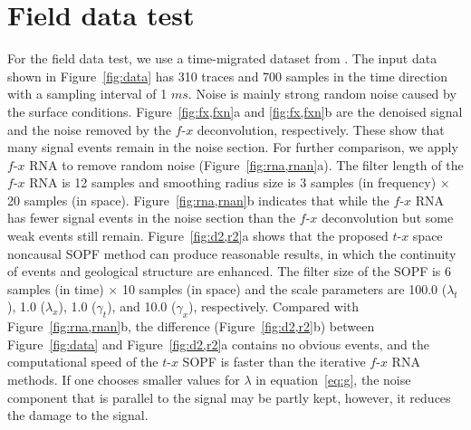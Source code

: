 
\section{Field data test}
For the field data test, we use a time-migrated dataset from
\cite{Liu13}. The input data shown in Figure~\ref{fig:data} has 310
traces and 700 samples in the time direction with a
sampling interval of 1 $ms$. Noise is mainly strong random noise
caused by the surface conditions. Figure~\ref{fig:fx,fxn}a and
\ref{fig:fx,fxn}b are the denoised signal and the noise removed by the
$f$-$x$ deconvolution, respectively. These show that many signal
events remain in the noise section. For further comparison, we apply
$f$-$x$ RNA to remove random noise (Figure~\ref{fig:rna,rnan}a). The
filter length of the $f$-$x$ RNA is 12 samples and smoothing radius
size is 3 samples (in frequency)
$\times$ 20 samples (in
space). Figure~\ref{fig:rna,rnan}b indicates that while the
$f$-$x$ RNA has fewer signal events in the noise section than the
$f$-$x$ deconvolution but some weak events still
remain. Figure~\ref{fig:d2,r2}a shows that the proposed $t$-$x$
space noncausal SOPF method can produce 
reasonable results, in which the continuity of events and geological
structure are enhanced. The filter size of the SOPF
is 6 samples (in time)
$\times$ 10 samples (in space) and the scale
parameters are 100.0 ($\lambda_t$), 1.0 ($\lambda_x$), 1.0
($\gamma_t$), and 10.0 ($\gamma_x$), respectively. Compared with
Figure~\ref{fig:rna,rnan}b, the difference (Figure~\ref{fig:d2,r2}b)
between Figure~\ref{fig:data} and Figure~\ref{fig:d2,r2}a contains no
obvious events, and the computational speed of the $t$-$x$ SOPF is
faster than the iterative $f$-$x$ RNA methods. If one chooses smaller
values for $\lambda$ in equation~\ref{eq:g}, the noise component
that is parallel to the signal may be partly kept, 
however, it reduces the damage to the signal.

